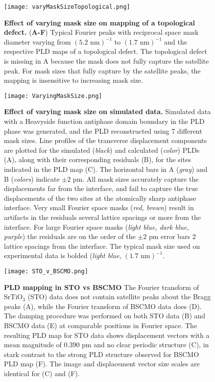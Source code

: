 \documentclass[12pt]{article}
\begin{document}
\clearpage

\begin{figure}
  \texttt{[image: varyMaskSizeTopological.png]}
  \caption{\textbf{Effect of varying mask size on mapping of a topological defect.} 
(\textbf{A-F}) Typical Fourier peaks with reciprocal space mask diameter varying from $(5.2\text{ nm})^{-1}$ to $(1.7\text{ nm})^{-1}$ and the respective PLD maps of a topological defect. 
The topological defect is missing in A because the mask does not fully capture the satellite peak. 
For mask sizes that fully capture by the satellite peaks, the mapping is insensitive to increasing mask size.
}
\label{F:VaryingMask_real_topo}
\end{figure}

\clearpage

\begin{figure}
  \texttt{[image: VaryingMaskSize.png]}
  \caption{\textbf{Effect of varying mask size on simulated data.} 
Simulated data with a Heavyside function antiphase domain boundary in the PLD phase was generated, and the PLD reconstructed using 7 different mask sizes.
Line profiles of the transverse displacement components are plotted for the simulated (\textit{black}) and calculated (\textit{color}) PLDs (A), along with their corresponding residuals (B), for the sites indicated in the PLD map (C).
The horizontal bars in A (\textit{gray}) and B (\textit{colors}) indicate $\pm2$ pm.
All mask sizes accurately capture the displacements far from the interface, and fail to capture the true displacements of the two sites at the atomically sharp antiphase interface. 
Very small Fourier space masks (\textit{red, brown}) result in artifacts in the residuals several lattice spacings or more from the interface.
For large Fourier space masks (\textit{light blue, dark blue, purple}) the residuals are on the order of the $\pm2$ pm error bars 2 lattice spacings from the interface.
The typical mask size used on experimental data is bolded (\textit{light blue}, $(1.7\text{ nm})^{-1}$.}
  \label{F:VaryingMask_sim}
\end{figure}


\clearpage

\begin{figure}
  \texttt{[image: STO\_v\_BSCMO.png]}
  \caption{\textbf{PLD mapping in STO vs BSCMO} 
The Fourier transform of SrTiO$_{3}$ (STO) data does not contain satellite peaks about the Bragg peaks (A), while the Fourier transform of BSCMO data does (D).
The damping procedure was performed on both STO data (B) and BSCMO data (E) at comparable positions in Fourier space.
The resulting PLD map for STO data shows displacement vectors with a mean magnitude of 0.390 pm and no clear periodic structure (C), in stark contrast to the strong PLD structure observed for BSCMO PLD map (F).
The image and displacement vector size scales are identical for (C) and (F).}
  \label{F:STO_v_BSCMO}
\end{figure}
\end{document}
